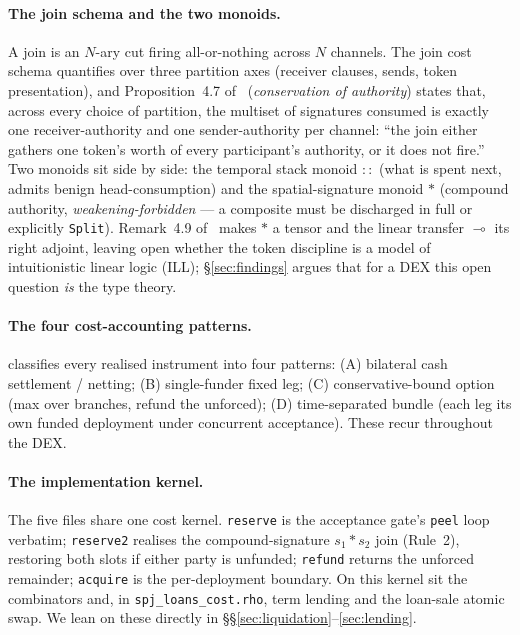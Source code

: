 \documentclass[11pt]{article}
\theoremstyle{definition}
\newcommand{\tensorsig}{\ensuremath{\ast}}
\newcommand{\lolli}{\ensuremath{\multimap}}
\begin{document}
\paragraph{The join schema and the two monoids.}
A join is an $N$-ary cut firing all-or-nothing across $N$ channels. The join cost schema quantifies
over three partition axes (receiver clauses, sends, token presentation), and
Proposition~4.7 of~\cite{cost} (\emph{conservation of authority}) states that, across every choice
of partition, the multiset of signatures consumed is exactly one receiver-authority and one
sender-authority per channel: ``the join either gathers one token's worth of every participant's
authority, or it does not fire.'' Two monoids sit side by side: the temporal stack monoid $::$
(what is spent next, admits benign head-consumption) and the spatial-signature monoid $\tensorsig$
(compound authority, \emph{weakening-forbidden} --- a composite must be discharged in full or
explicitly \texttt{Split}). Remark~4.9 of~\cite{cost} makes $\tensorsig$ a tensor and the linear
transfer $\lolli$ its right adjoint, leaving open whether the token discipline is a model of
intuitionistic linear logic (ILL); \S\ref{sec:findings} argues that for a DEX this open question
\emph{is} the type theory.

\paragraph{The four cost-accounting patterns.}
\cite{finrho} classifies every realised instrument into four patterns: (A) bilateral cash
settlement / netting; (B) single-funder fixed leg; (C) conservative-bound option (max over branches,
refund the unforced); (D) time-separated bundle (each leg its own funded deployment under concurrent
acceptance). These recur throughout the DEX.

\paragraph{The implementation kernel.}
The five files share one cost kernel. \texttt{reserve} is the acceptance gate's \texttt{peel} loop
verbatim; \texttt{reserve2} realises the compound-signature $s_1 \tensorsig s_2$ join (Rule~2),
restoring both slots if either party is unfunded; \texttt{refund} returns the unforced remainder;
\texttt{acquire} is the per-deployment boundary. On this kernel sit the combinators and, in
\texttt{spj\_loans\_cost.rho}, term lending and the loan-sale atomic swap. We lean on these directly
in \S\S\ref{sec:liquidation}--\ref{sec:lending}.
\end{document}
